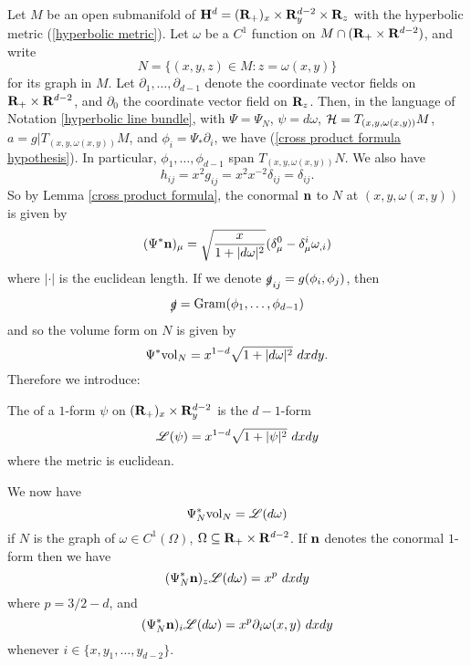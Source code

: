 Let $M$ be an open submanifold of $\mathbf H^d = (\mathbf{R}_+)_x \times \mathbf{R}^{d - 2}_y \times \mathbf{R}_z$ with the hyperbolic metric (\ref{hyperbolic metric}).
Let $\omega$ be a $C^1$ function on $M \cap (\mathbf{R}_+ \times \mathbf{R}^{d - 2})$, and write
$$N = \{(x, y, z) \in M: z = \omega(x, y)\}$$
for its graph in $M$.
Let $\partial_1, \dots, \partial_{d - 1}$ denote the coordinate vector fields on $\mathbf{R}_+ \times \mathbf{R}^{d - 2}$, and $\partial_0$ the coordinate vector field on $\mathbf{R}_z$.
Then, in the language of Notation \ref{hyperbolic line bundle}, with $\Psi = \Psi_N$, $\psi = d\omega$, $\mathcal H = T_{(x, y, \omega(x, y))} M$, $a = g|T_{(x, y, \omega(x, y))} M$, and $\phi_i = \Psi_* \partial_i$, we have (\ref{cross product formula hypothesis}).
In particular, $\phi_1, \dots, \phi_{d - 1}$ span $T_{(x, y, \omega(x, y))}N$.
We also have 
$$h_{ij} = x^2 g_{ij} = x^2 x^{-2} \delta_{ij} = \delta_{ij}.$$
So by Lemma \ref{cross product formula}, the conormal $\mathbf n$ to $N$ at $(x, y, \omega(x, y))$ is given by 
$$(\Psi^* \mathbf n)_\mu = \sqrt{\frac{x}{1 + |d\omega|^2}} (\delta_\mu^0 - \delta_\mu^i \omega_{,i})$$
where $|\cdot|$ is the euclidean length.
If we denote $\slashed g_{ij} = g(\phi_i, \phi_j)$, then
$$\slashed g = \operatorname{Gram}(\phi_1, \dots, \phi_{d - 1})$$
and so the volume form on $N$ is given by 
$$\Psi^* \mathrm{vol}_N = x^{1 - d} \sqrt{1 + |d\omega|^2} ~dx dy.$$
Therefore we introduce:

\begin{definition}
    The  of a $1$-form $\psi$ on $(\mathbf{R}_+)_x \times \mathbf{R}^{d - 2}_y$ is the $d-1$-form
    $$\mathscr L(\psi) = x^{1 - d} \sqrt{1 + |\psi|^2} ~dxdy$$
    where the metric is euclidean.
\end{definition}
    
We now have
\begin{equation}\label{Lagrangian formula}
    \Psi_N^* \mathrm{vol}_N = \mathscr L(d\omega)
\end{equation}
if $N$ is the graph of $\omega \in C^1(\Omega)$, $\Omega \subseteq \mathbf{R}_+ \times \mathbf{R}^{d - 2}$.
If $\mathbf n$ denotes the conormal $1$-form then we have 
\begin{equation}\label{Lagrangian normal z}
(\Psi^*_N \mathbf n)_z \mathscr L(d\omega) = x^p ~dxdy
\end{equation}
where $p = 3/2 - d$, and 
\begin{equation}\label{Lagrangian normal xy}
(\Psi^*_N \mathbf n)_i \mathscr L(d\omega) = x^p \partial_i \omega(x, y) ~dxdy
\end{equation}
whenever $i \in \{x, y_1, \dots, y_{d - 2}\}$.

